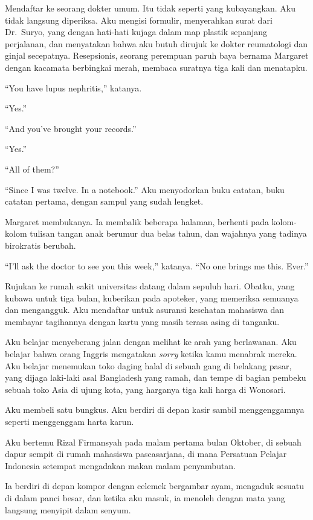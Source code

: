 \documentclass[11pt,twoside,openany]{book}
\makeatletter
\newcommand{\scenebreak}{\par\vspace{0.9em}{\centering\textsc{*\hspace{0.7em}*\hspace{0.7em}*}\par}\vspace{0.9em}\@afterindentfalse\@afterheading}
\makeatother
\begin{document}
Mendaftar ke seorang dokter umum. Itu tidak seperti yang kubayangkan. Aku tidak langsung diperiksa. Aku mengisi formulir, menyerahkan surat dari Dr.~Suryo, yang dengan hati-hati kujaga dalam map plastik sepanjang perjalanan, dan menyatakan bahwa aku butuh dirujuk ke dokter reumatologi dan ginjal secepatnya. Resepsionis, seorang perempuan paruh baya bernama Margaret dengan kacamata berbingkai merah, membaca suratnya tiga kali dan menatapku.

``You have lupus nephritis,'' katanya.

``Yes.''

``And you've brought your records.''

``Yes.''

``All of them?''

``Since I was twelve. In a notebook.'' Aku menyodorkan buku catatan, buku catatan pertama, dengan sampul yang sudah lengket.

Margaret membukanya. Ia membalik beberapa halaman, berhenti pada kolom-kolom tulisan tangan anak berumur dua belas tahun, dan wajahnya yang tadinya birokratis berubah.

``I'll ask the doctor to see you this week,'' katanya. ``No one brings me this. Ever.''

Rujukan ke rumah sakit universitas datang dalam sepuluh hari. Obatku, yang kubawa untuk tiga bulan, kuberikan pada apoteker, yang memeriksa semuanya dan mengangguk. Aku mendaftar untuk asuransi kesehatan mahasiswa dan membayar tagihannya dengan kartu yang masih terasa asing di tanganku.

Aku belajar menyeberang jalan dengan melihat ke arah yang berlawanan. Aku belajar bahwa orang Inggris mengatakan \emph{sorry} ketika kamu menabrak mereka. Aku belajar menemukan toko daging halal di sebuah gang di belakang pasar, yang dijaga laki-laki asal Bangladesh yang ramah, dan tempe di bagian pembeku sebuah toko Asia di ujung kota, yang harganya tiga kali harga di Wonosari.

Aku membeli satu bungkus. Aku berdiri di depan kasir sambil menggenggamnya seperti menggenggam harta karun.

\scenebreak
Aku bertemu Rizal Firmansyah pada malam pertama bulan Oktober, di sebuah dapur sempit di rumah mahasiswa pascasarjana, di mana Persatuan Pelajar Indonesia setempat mengadakan makan malam penyambutan.

Ia berdiri di depan kompor dengan celemek bergambar ayam, mengaduk sesuatu di dalam panci besar, dan ketika aku masuk, ia menoleh dengan mata yang langsung menyipit dalam senyum.
\end{document}
